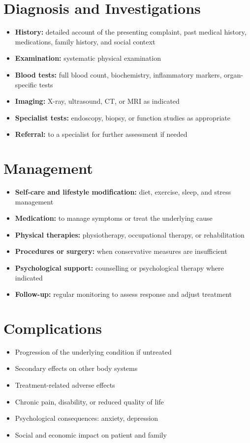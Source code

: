 \section*{Diagnosis and Investigations}
\begin{itemize}
    \item \textbf{History:} detailed account of the presenting complaint, past medical history, medications, family history, and social context
    \item \textbf{Examination:} systematic physical examination
    \item \textbf{Blood tests:} full blood count, biochemistry, inflammatory markers, organ-specific tests
    \item \textbf{Imaging:} X-ray, ultrasound, CT, or MRI as indicated
    \item \textbf{Specialist tests:} endoscopy, biopsy, or function studies as appropriate
    \item \textbf{Referral:} to a specialist for further assessment if needed
\end{itemize}

\section*{Management}
\begin{itemize}
    \item \textbf{Self-care and lifestyle modification:} diet, exercise, sleep, and stress management
    \item \textbf{Medication:} to manage symptoms or treat the underlying cause
    \item \textbf{Physical therapies:} physiotherapy, occupational therapy, or rehabilitation
    \item \textbf{Procedures or surgery:} when conservative measures are insufficient
    \item \textbf{Psychological support:} counselling or psychological therapy where indicated
    \item \textbf{Follow-up:} regular monitoring to assess response and adjust treatment
\end{itemize}

\section*{Complications}
\begin{itemize}
    \item Progression of the underlying condition if untreated
    \item Secondary effects on other body systems
    \item Treatment-related adverse effects
    \item Chronic pain, disability, or reduced quality of life
    \item Psychological consequences: anxiety, depression
    \item Social and economic impact on patient and family
\end{itemize}


